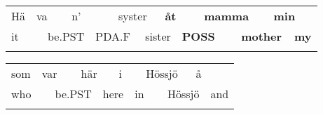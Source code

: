 \begin{listWWNumlxxxvleveli}
\item 

\end{listWWNumlxxxvleveli}

\begin{tabular}{llllllllllllll}
\lsptoprule
Hä & \multicolumn{2}{l}{va

} & \multicolumn{2}{l}{n’

} & \multicolumn{2}{l}{syster

} & \multicolumn{2}{l}{{\bfseries åt}

} & \multicolumn{2}{l}{{\bfseries mamma}

} & \multicolumn{2}{l}{{\bfseries min}

} & \\
\multicolumn{2}{l}{it

} & \multicolumn{2}{l}{be.PST

} & \multicolumn{2}{l}{PDA.F

} & \multicolumn{2}{l}{sister

} & \multicolumn{2}{l}{{\bfseries POSS}

} & \multicolumn{2}{l}{{\bfseries mother}

} & \multicolumn{2}{l}{{\bfseries my}

}\\
\lspbottomrule
\end{tabular}

\begin{tabular}{llllllllllll}
\lsptoprule
som & \multicolumn{2}{l}{var

} & \multicolumn{2}{l}{här

} & \multicolumn{2}{l}{i

} & \multicolumn{2}{l}{Hössjö

} & \multicolumn{2}{l}{å

} & \\
\multicolumn{2}{l}{who

} & \multicolumn{2}{l}{be.PST

} & \multicolumn{2}{l}{here

} & \multicolumn{2}{l}{in

} & \multicolumn{2}{l}{Hössjö

} & \multicolumn{2}{l}{and

}\\
\lspbottomrule
\end{tabular}

